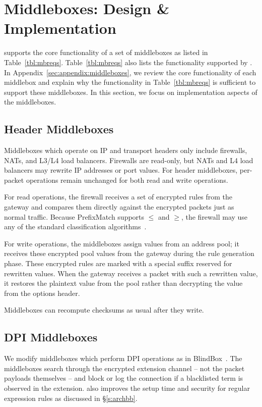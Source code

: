 

\section{Middleboxes: Design \& Implementation}
\label{sec:mbs}

 \sys supports the core functionality of a set of middleboxes as listed in Table~\ref{tbl:mbreqs}.
Table~\ref{tbl:mbreqs} also lists the functionality supported by \sys.   In Appendix~\ref{sec:appendix:middleboxes}, we review the core functionality of each middlebox
  and explain why the functionality in Table~\ref{tbl:mbreqs} is sufficient to support these middleboxes. 
 In this section, we focus on implementation aspects of the middleboxes.



\subsection{Header Middleboxes}
Middleboxes which operate on IP and transport headers only include firewalls, NATs, and L3/L4 load balancers.
Firewalls are read-only, but NATs and L4 load balancers may rewrite IP addresses or port values. 
For header middleboxes, per-packet operations remain unchanged for both read and write operations.

For read operations, the firewall receives a set of encrypted rules from the gateway and compares them directly against the encrypted packets just as normal traffic. Because PrefixMatch supports $\leq$ and $\geq$, the firewall may use any of the standard classification algorithms~\cite{packet_classif}.




For write operations, the middleboxes assign values from an address pool; it receives these encrypted pool values from the gateway during the rule generation phase.
These encrypted rules are marked with a special suffix reserved for rewritten values.
When the gateway receives a packet with such a rewritten value, it restores the plaintext value from the pool rather than decrypting the value from the options header. 

Middleboxes can recompute checksums as usual after they write.

\subsection{DPI Middleboxes}
We modify middleboxes which perform DPI operations as in BlindBox~\cite{blindbox}. 
The middleboxes search through the encrypted extension channel -- not the packet payloads themselves -- and block or log the connection if a blacklisted term is observed in the extension.
\sys also improves the setup time and security for regular expression rules as discussed in \S\ref{s:archbb}.

